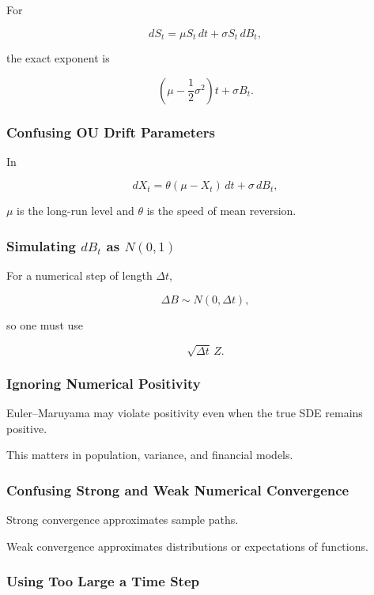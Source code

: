 For

\[
dS_t
=
\mu S_t\,dt
+
\sigma S_t\,dB_t,
\]

the exact exponent is

\[
\boxed{
\left(
\mu-\frac12\sigma^2
\right)t
+
\sigma B_t.
}
\]

\subsubsection{Confusing OU Drift Parameters}

In

\[
dX_t
=
\theta(\mu-X_t)\,dt+\sigma\,dB_t,
\]

\(\mu\) is the long-run level and \(\theta\) is the speed of mean
reversion.

\subsubsection{Simulating \(dB_t\) as \(N(0,1)\)}

For a numerical step of length \(\Delta t\),

\[
\boxed{
\Delta B
\sim
N(0,\Delta t),
}
\]

so one must use

\[
\boxed{
\sqrt{\Delta t}\,Z.
}
\]

\subsubsection{Ignoring Numerical Positivity}

Euler--Maruyama may violate positivity even when the true SDE remains
positive.

This matters in population, variance, and financial models.

\subsubsection{Confusing Strong and Weak Numerical Convergence}

Strong convergence approximates sample paths.

Weak convergence approximates distributions or expectations of
functions.

\subsubsection{Using Too Large a Time Step}

